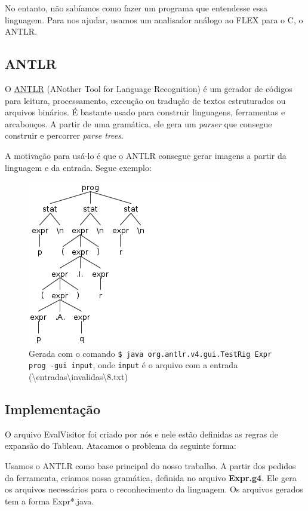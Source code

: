 \documentclass[12pt,letterpaper]{article}
\begin{document}
No entanto, não sabíamos como fazer um programa que entendesse essa linguagem. Para nos ajudar, usamos um analisador análogo ao FLEX para o C, o ANTLR.

\subsection{ANTLR}

O \href{http://www.antlr.org/}{ANTLR} (ANother Tool for Language Recognition)
é um gerador de códigos para leitura, processamento, execução ou tradução de textos estruturados ou arquivos binários. É bastante usado para construir linguagens, ferramentas e arcabouços. A partir de uma gramática, ele gera um \textit{parser} que consegue construir e percorrer \textit{parse trees}.

A motivação para usá-lo é que o ANTLR consegue gerar imagens a partir da linguagem e da entrada. Segue exemplo:

\begin{figure}[!h]
	\centering
	\includegraphics[scale=0.9]{1.png}
	\caption{Gerada com o comando \texttt{\$ java org.antlr.v4.gui.TestRig Expr prog -gui input}, onde \texttt{input} é o arquivo com a entrada (\textbackslash entradas\textbackslash invalidas\textbackslash 8.txt)}
\end{figure}

\subsection{Implementação}

O arquivo EvalVisitor foi criado por nós e nele estão definidas as regras de expansão do Tableau. Atacamos o problema da seguinte forma:

Usamos o ANTLR como base principal do nosso trabalho. A partir dos pedidos da ferramenta, criamos nossa gramática, definida no arquivo \textbf{Expr.g4}. Ele gera os arquivos necessários para o reconhecimento da linguagem. Os arquivos gerados tem a forma Expr*.java.
\end{document}
